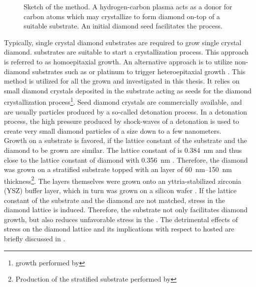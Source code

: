 	\begin{figure}[htp]
		\centering
		\caption[\CVD production method]{Sketch of the \CVD method. A hydrogen-carbon plasma acts as a donor for carbon atoms which may crystallize to form diamond on-top of a suitable \ir substrate. An initial diamond seed facilitates the process.}
		\label{fig::cvd_sketch}
	\end{figure}

	Typically, single crystal diamond substrates are required to grow single crystal diamond. \HPHT substrates are suitable to start a crystallization process. This approach is referred to as homoepitaxial growth. An alternative approach is to utilize non-diamond substrates such as \ir or platinum to trigger heteroepitaxial growth \cite{tachibana2001growth, lin1994local}.
	This method is utilized for all the \CVD \nds grown and investigated in this thesis.
	It relies on small diamond crystals deposited in the substrate acting as seeds for the diamond crystallization process\footnote{\CVD \nd growth performed by \gsell}. Seed diamond crystals are commercially available, and are usually particles produced by a so-called detonation process.
	In a detonation process, the high pressure produced by shock-waves of a detonation is used to create very small diamond particles of a size down to a few nanometers.
	\\
	Growth on a substrate is favored, if the lattice constant of the substrate and the diamond to be grown are similar.
	The lattice constant of \ir is \SI{0.384}{nm} \cite{Arblaster2010,Gsell2007} and thus close to the lattice constant of diamond with \SI{0.356}{nm} \cite{Davis1993}.
	Therefore, the diamond was grown on a stratified substrate topped with an \ir layer of \SIrange{60}{150}{nm} thickness\footnote{Production of the stratified substrate performed by \gsell}.
	The \ir layers themselves were grown onto an yttria-stabilized zirconia (YSZ) buffer layer, which in turn was grown on a silicon wafer \cite{Gsell2004a}.
	If the lattice constant of the substrate and the diamond are not matched, stress in the diamond lattice is induced.
	Therefore, the \ir substrate not only facilitates diamond growth, but also reduces unfavorable stress in the \nds. The detrimental effects of stress on the diamond lattice and its implications with respect to hosted \sivs are briefly discussed in .
